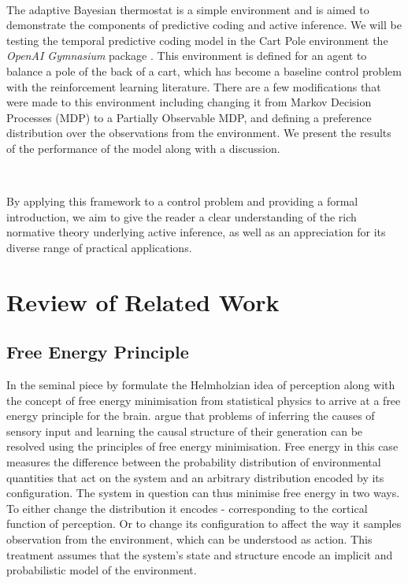 \documentclass{article}
\begin{document}
\

The adaptive Bayesian thermostat is a simple environment and is aimed to demonstrate the components of predictive coding and active inference. We will be testing the temporal predictive coding model in the Cart Pole environment the \textit{OpenAI Gymnasium} package \citep{towers2024gymnasium}. This environment is defined for an agent to balance a pole of the back of a cart, which has become a baseline control problem with the reinforcement learning literature. There are a few modifications that were made to this environment including changing it from Markov Decision Processes (MDP) to a Partially Observable MDP, and defining a preference distribution over the observations from the environment. We present the results of the performance of the model along with a discussion.

\

By applying this framework to a control problem and providing a formal introduction, we aim to give the reader a clear understanding of the rich normative theory underlying active inference, as well as an appreciation for its diverse range of practical applications.

\section{Review of Related Work}

\subsection{Free Energy Principle}

In the seminal piece by \cite{friston2006free} formulate the Helmholzian idea of perception along with the concept of free energy minimisation from statistical physics to arrive at a free energy principle for the brain. \citet{friston2006free} argue that problems of inferring the causes of sensory input and learning the causal structure of their generation can be resolved using the principles of free energy minimisation. Free energy in this case measures the difference between the probability distribution of environmental quantities that act on the system and an arbitrary distribution encoded by its configuration. The system in question can thus minimise free energy in two ways. To either change the distribution it encodes - corresponding to the cortical function of perception. Or to change its configuration to affect the way it samples observation from the environment, which can be understood as action. This treatment assumes that the system’s state and structure encode an implicit and probabilistic model of the environment.
\end{document}
